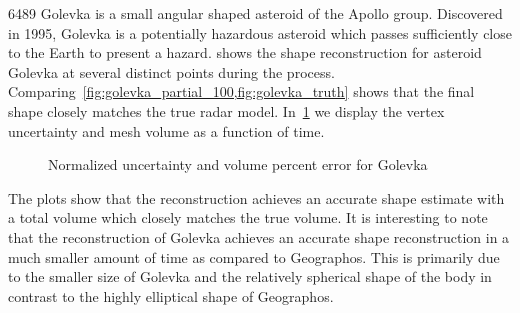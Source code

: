 \num{6489} Golevka is a small angular shaped asteroid of the Apollo group.
Discovered in \num{1995}, Golevka is a potentially hazardous asteroid which passes sufficiently close to the Earth to present a hazard.
 shows the shape reconstruction for asteroid Golevka at several distinct points during the process.
Comparing~\cref{fig:golevka_partial_100,fig:golevka_truth} shows that the final shape closely matches the true radar model.
In~\cref{fig:golevka_metrics} we display the vertex uncertainty and mesh volume as a function of time.

\begin{figure}[htbp]
    \centering
    
    \caption{Normalized uncertainty and volume percent error for Golevka\label{fig:golevka_metrics}}
\end{figure}

The plots show that the reconstruction achieves an accurate shape estimate with a total volume which closely matches the true volume.
It is interesting to note that the reconstruction of Golevka achieves an accurate shape reconstruction in a much smaller amount of time as compared to Geographos.
This is primarily due to the smaller size of Golevka and the relatively spherical shape of the body in contrast to the highly elliptical shape of Geographos.

